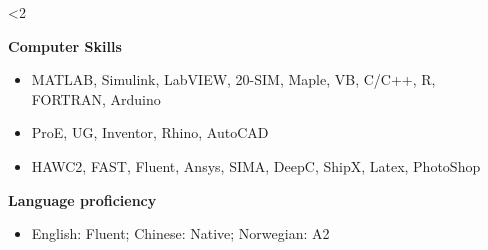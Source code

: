 \documentclass[10pt]{ctexart}
\begin{document}
\ifnum\value{num}<2 {
    \vspace{-0.8em}
    \textbf{Computer Skills}\vspace{-1.00em}
    \begin{itemize}[label={}]\setlength\itemsep{0.0em}
    \item MATLAB, Simulink, LabVIEW, 20-SIM, Maple, VB, C/C++, R, FORTRAN, Arduino
    \item ProE, UG, Inventor, Rhino, AutoCAD
    \item HAWC2, FAST, Fluent, Ansys, SIMA, DeepC, ShipX, Latex, PhotoShop
    \end{itemize}
    \vspace*{0.1em}
    
    \vspace{-0.8em}
    \textbf{Language proficiency}\vspace{-1.00em}
    \begin{itemize}[label={}] \setlength\itemsep{0.0em}
    \item English: Fluent; Chinese: Native; Norwegian: A2
    \end{itemize}
    \vspace*{0.1em}
}\else{

}\fi
\end{document}
